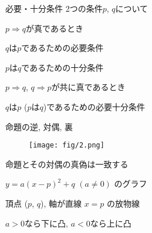 \documentclass[aspectratio=169, 12pt]{beamer}
\begin{document}
\begin{frame}{必要・十分条件}
    2つの条件$p$, $q$について \par
    $p \Rightarrow q$が真であるとき \par
    \begin{center}
        $q$は$p$\space であるための必要条件 \par
        $p$は$q$\space であるための十分条件
    \end{center}
    $p \Rightarrow q$, $q \Rightarrow p$が共に真であるとき \par
    \begin{center}
        $q$は$p$ ($p$は$q$)であるための必要十分条件
    \end{center}
\end{frame}
\begin{frame}{命題の逆, 対偶, 裏}
    \begin{figure}[htbp]
        \begin{center}
            \texttt{[image: fig/2.png]}
        \end{center}
    \end{figure}
    \begin{center}
        命題とその対偶の真偽は一致する
    \end{center}
\end{frame}

\begin{frame}{$y=a(x-p)^2+q$ $ (a\neq 0)$ のグラフ}
    \begin{center}
        頂点 ($p$, $q$), 軸が直線 $x=p$ の放物線 \par
        $a>0$なら下に凸, $a<0$なら上に凸
    \end{center}
\end{frame}
\end{document}
